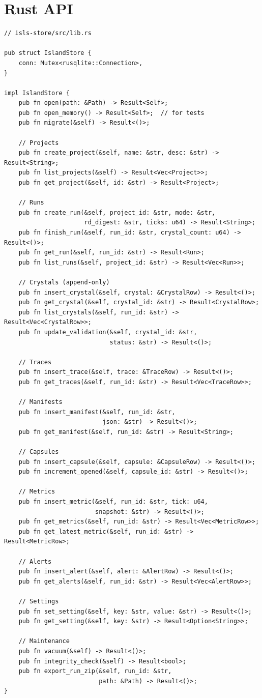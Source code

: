 \documentclass[11pt,a4paper,twoside]{article}
\theoremstyle{definition}
\theoremstyle{plain}
\theoremstyle{remark}
\begin{document}
\section{Rust API}\label{sec:store:api}

\begin{verbatim}
// isls-store/src/lib.rs

pub struct IslandStore {
    conn: Mutex<rusqlite::Connection>,
}

impl IslandStore {
    pub fn open(path: &Path) -> Result<Self>;
    pub fn open_memory() -> Result<Self>;  // for tests
    pub fn migrate(&self) -> Result<()>;

    // Projects
    pub fn create_project(&self, name: &str, desc: &str) -> Result<String>;
    pub fn list_projects(&self) -> Result<Vec<Project>>;
    pub fn get_project(&self, id: &str) -> Result<Project>;

    // Runs
    pub fn create_run(&self, project_id: &str, mode: &str,
                      rd_digest: &str, ticks: u64) -> Result<String>;
    pub fn finish_run(&self, run_id: &str, crystal_count: u64) -> Result<()>;
    pub fn get_run(&self, run_id: &str) -> Result<Run>;
    pub fn list_runs(&self, project_id: &str) -> Result<Vec<Run>>;

    // Crystals (append-only)
    pub fn insert_crystal(&self, crystal: &CrystalRow) -> Result<()>;
    pub fn get_crystal(&self, crystal_id: &str) -> Result<CrystalRow>;
    pub fn list_crystals(&self, run_id: &str) -> Result<Vec<CrystalRow>>;
    pub fn update_validation(&self, crystal_id: &str,
                             status: &str) -> Result<()>;

    // Traces
    pub fn insert_trace(&self, trace: &TraceRow) -> Result<()>;
    pub fn get_traces(&self, run_id: &str) -> Result<Vec<TraceRow>>;

    // Manifests
    pub fn insert_manifest(&self, run_id: &str,
                           json: &str) -> Result<()>;
    pub fn get_manifest(&self, run_id: &str) -> Result<String>;

    // Capsules
    pub fn insert_capsule(&self, capsule: &CapsuleRow) -> Result<()>;
    pub fn increment_opened(&self, capsule_id: &str) -> Result<()>;

    // Metrics
    pub fn insert_metric(&self, run_id: &str, tick: u64,
                         snapshot: &str) -> Result<()>;
    pub fn get_metrics(&self, run_id: &str) -> Result<Vec<MetricRow>>;
    pub fn get_latest_metric(&self, run_id: &str) -> Result<MetricRow>;

    // Alerts
    pub fn insert_alert(&self, alert: &AlertRow) -> Result<()>;
    pub fn get_alerts(&self, run_id: &str) -> Result<Vec<AlertRow>>;

    // Settings
    pub fn set_setting(&self, key: &str, value: &str) -> Result<()>;
    pub fn get_setting(&self, key: &str) -> Result<Option<String>>;

    // Maintenance
    pub fn vacuum(&self) -> Result<()>;
    pub fn integrity_check(&self) -> Result<bool>;
    pub fn export_run_zip(&self, run_id: &str,
                          path: &Path) -> Result<()>;
}
\end{verbatim}
\end{document}

